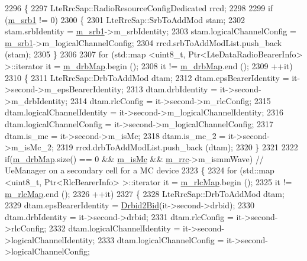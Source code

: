 \begin{DoxyCode}
2296 \{
2297   LteRrcSap::RadioResourceConfigDedicated rrcd;
2298 
2299   \textcolor{keywordflow}{if} (\hyperlink{classns3_1_1UeManager_a196852199b6a48c365eadfec4ba89935}{m\_srb1} != 0)
2300     \{
2301       LteRrcSap::SrbToAddMod stam;
2302       stam.srbIdentity = \hyperlink{classns3_1_1UeManager_a196852199b6a48c365eadfec4ba89935}{m\_srb1}->m\_srbIdentity;
2303       stam.logicalChannelConfig = \hyperlink{classns3_1_1UeManager_a196852199b6a48c365eadfec4ba89935}{m\_srb1}->m\_logicalChannelConfig;
2304       rrcd.srbToAddModList.push\_back (stam);
2305     \}
2306 
2307   \textcolor{keywordflow}{for} (std::map <uint8\_t, Ptr<LteDataRadioBearerInfo> >::iterator it = \hyperlink{classns3_1_1UeManager_a18499c025730b63c73e5d93effff57aa}{m\_drbMap}.begin ();
2308        it != \hyperlink{classns3_1_1UeManager_a18499c025730b63c73e5d93effff57aa}{m\_drbMap}.end ();
2309        ++it)
2310     \{
2311       LteRrcSap::DrbToAddMod dtam;
2312       dtam.epsBearerIdentity = it->second->m\_epsBearerIdentity;
2313       dtam.drbIdentity = it->second->m\_drbIdentity;
2314       dtam.rlcConfig = it->second->m\_rlcConfig;
2315       dtam.logicalChannelIdentity = it->second->m\_logicalChannelIdentity;
2316       dtam.logicalChannelConfig = it->second->m\_logicalChannelConfig;
2317       dtam.is\_mc = it->second->m\_isMc;
2318       dtam.is\_mc\_2 = it->second->m\_isMc\_2;
2319       rrcd.drbToAddModList.push\_back (dtam);
2320     \}
2321 
2322   \textcolor{keywordflow}{if}(\hyperlink{classns3_1_1UeManager_a18499c025730b63c73e5d93effff57aa}{m\_drbMap}.size() == 0 && \hyperlink{classns3_1_1UeManager_a78958b4916253f7e2f9da8fd7f4662b6}{m\_isMc} && \hyperlink{classns3_1_1UeManager_ab4405e9f354c66e7c1a4c95832290f5b}{m\_rrc}->m\_ismmWave) \textcolor{comment}{// UeManager on a secondary
       cell for a MC device}
2323   \{
2324     \textcolor{keywordflow}{for} (std::map <uint8\_t, Ptr<RlcBearerInfo> >::iterator it = \hyperlink{classns3_1_1UeManager_a64f37a901db7a322552ba08d87e65770}{m\_rlcMap}.begin ();
2325        it != \hyperlink{classns3_1_1UeManager_a64f37a901db7a322552ba08d87e65770}{m\_rlcMap}.end ();
2326        ++it)
2327     \{
2328       LteRrcSap::DrbToAddMod dtam;
2329       dtam.epsBearerIdentity = \hyperlink{classns3_1_1UeManager_a7f9cf28eee4b60f195e9f4577a8a3a35}{Drbid2Bid}(it->second->drbid);
2330       dtam.drbIdentity = it->second->drbid;
2331       dtam.rlcConfig = it->second->rlcConfig;
2332       dtam.logicalChannelIdentity = it->second->logicalChannelIdentity;
2333       dtam.logicalChannelConfig = it->second->logicalChannelConfig;

\end{DoxyCode}
